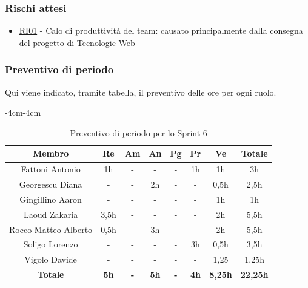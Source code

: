 \documentclass[a4paper,12pt]{article}
\begin{document}
\subsubsection{Rischi attesi}
\begin{itemize}
    \item \hyperref[RI01]{RI01} - Calo di produttività del team: causato principalmente dalla consegna del progetto di Tecnologie Web
\end{itemize}

\subsubsection{Preventivo di periodo}
Qui viene indicato, tramite tabella, il preventivo delle ore per ogni ruolo.
\begin{table}[H]
    \begin{adjustwidth}{-4cm}{-4cm}
    \centering
    \begin{tabular}{|c|c|c|c|c|c|c|c|}
        \hline
        \textbf{Membro}& \textbf{Re} & \textbf{Am} & \textbf{An} & \textbf{Pg} & \textbf{Pr} & \textbf{Ve} & \textbf{Totale} \\
        \hline
        Fattoni Antonio & 1h & - & - & - & 1h & 1h & 3h \\
        \hline
        Georgescu Diana & - & - & 2h & - & - & 0,5h & 2,5h \\
        \hline
        Gingillino Aaron & - & - & - & - & - & 1h & 1h \\
        \hline
        Laoud Zakaria & 3,5h & - & - & - & - & 2h & 5,5h \\
        \hline
        Rocco Matteo Alberto & 0,5h & - & 3h & - & - & 2h & 5,5h \\
        \hline
        Soligo Lorenzo & - & - & - & - & 3h & 0,5h & 3,5h \\
        \hline
        Vigolo Davide & - & - & - & - & - & 1,25 & 1,25h \\
        \hline
        \textbf{Totale} & \textbf{5h} & \textbf{-} & \textbf{5h} & \textbf{-} & \textbf{4h} & \textbf{8,25h} & \textbf{22,25h} \\
        \hline
    \end{tabular}
    \caption{Preventivo di periodo per lo Sprint 6}
    \end{adjustwidth}
\end{table}
\end{document}
